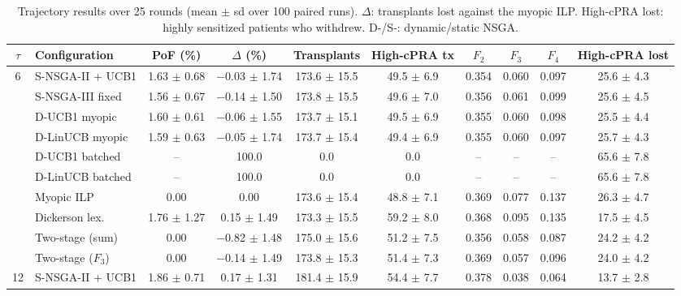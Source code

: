 \documentclass[journal]{IEEEtran}
\begin{document}
\begin{table}[!t]
\centering
\caption{Trajectory results over 25 rounds (mean $\pm$ sd over 100
paired runs). $\Delta$: transplants lost against the myopic ILP.
High-cPRA lost: highly sensitized patients who withdrew.
D-/S-: dynamic/static NSGA.}
\label{tab:main}
\footnotesize
\setlength{\tabcolsep}{3.5pt}
\begin{tabular}{@{}cl cccccccc@{}}
\toprule
$\tau$ & Configuration & PoF (\%) & $\Delta$ (\%) & Transplants
 & High-cPRA tx & $F_2$ & $F_3$ & $F_4$ & High-cPRA lost \\
\midrule
\multirow{10}{*}{6}
 & S-NSGA-II + UCB1   & 1.63 $\pm$ 0.68 & $-$0.03 $\pm$ 1.74 & 173.6 $\pm$ 15.5 & 49.5 $\pm$ 6.9 & 0.354 & 0.060 & 0.097 & 25.6 $\pm$ 4.3 \\
 & S-NSGA-III fixed   & 1.56 $\pm$ 0.67 & $-$0.14 $\pm$ 1.50 & 173.8 $\pm$ 15.5 & 49.6 $\pm$ 7.0 & 0.356 & 0.061 & 0.099 & 25.6 $\pm$ 4.5 \\
 & D-UCB1 myopic      & 1.60 $\pm$ 0.61 & $-$0.06 $\pm$ 1.55 & 173.7 $\pm$ 15.1 & 49.5 $\pm$ 6.9 & 0.355 & 0.060 & 0.098 & 25.5 $\pm$ 4.4 \\
 & D-LinUCB myopic    & 1.59 $\pm$ 0.63 & $-$0.05 $\pm$ 1.74 & 173.7 $\pm$ 15.4 & 49.4 $\pm$ 6.9 & 0.355 & 0.060 & 0.097 & 25.7 $\pm$ 4.3 \\
 & D-UCB1 batched     & --              & 100.0              & 0.0              & 0.0            & --    & --    & --    & 65.6 $\pm$ 7.8 \\
 & D-LinUCB batched   & --              & 100.0              & 0.0              & 0.0            & --    & --    & --    & 65.6 $\pm$ 7.8 \\
 & Myopic ILP         & 0.00            & 0.00               & 173.6 $\pm$ 15.4 & 48.8 $\pm$ 7.1 & 0.369 & 0.077 & 0.137 & 26.3 $\pm$ 4.7 \\
 & Dickerson lex.     & 1.76 $\pm$ 1.27 & 0.15 $\pm$ 1.49    & 173.3 $\pm$ 15.5 & 59.2 $\pm$ 8.0 & 0.368 & 0.095 & 0.135 & 17.5 $\pm$ 4.5 \\
 & Two-stage (sum)    & 0.00            & $-$0.82 $\pm$ 1.48 & 175.0 $\pm$ 15.6 & 51.2 $\pm$ 7.5 & 0.356 & 0.058 & 0.087 & 24.2 $\pm$ 4.2 \\
 & Two-stage ($F_3$)  & 0.00            & $-$0.14 $\pm$ 1.49 & 173.8 $\pm$ 15.3 & 51.4 $\pm$ 7.3 & 0.369 & 0.057 & 0.096 & 24.0 $\pm$ 4.2 \\
\midrule
\multirow{10}{*}{12}
 & S-NSGA-II + UCB1   & 1.86 $\pm$ 0.71 & 0.17 $\pm$ 1.31   & 181.4 $\pm$ 15.9 & 54.4 $\pm$ 7.7 & 0.378 & 0.038 & 0.064 & 13.7 $\pm$ 2.8 \\

\end{tabular}
\end{table}
\end{document}
